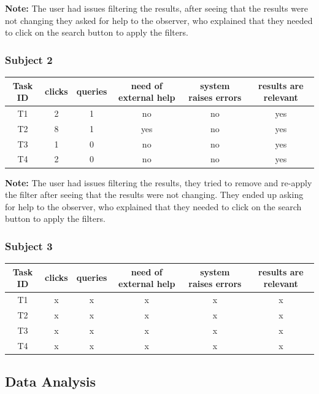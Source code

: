 \documentclass[unicode,9pt,a4paper,oneside,numbers=endperiod,openany]{scrartcl}
\begin{document}
\vspace{0.2cm}

\textbf{Note:} The user had issues filtering the results, after seeing that the results were not changing they asked for help to the observer, 
who explained that they needed to click on the search button to apply the filters.

\subsubsection{Subject 2}

\begin{tabular}{c|c|c|c|c|c}
    Task ID & clicks & queries & need of external help & system raises errors & results are relevant \\ \hline
    T1      & 2      & 1       & no                    & no                   & yes                  \\
    T2      & 8      & 1       & yes                   & no                   & yes                  \\
    T3      & 1      & 0       & no                    & no                   & yes                  \\
    T4      & 2      & 0       & no                    & no                   & yes                  \\
\end{tabular}

\vspace{0.2cm}
\textbf{Note:} The user had issues filtering the results, they tried to remove and re-apply the filter after seeing that the results were not changing.
They ended up asking for help to the observer, who explained that they needed to click on the search button to apply the filters.

\subsubsection{Subject 3}

\begin{tabular}{c|c|c|c|c|c}
    Task ID & clicks & queries & need of external help & system raises errors & results are relevant \\ \hline
    T1      & x      & x       & x                     & x                    & x                    \\
    T2      & x      & x       & x                     & x                    & x                    \\
    T3      & x      & x       & x                     & x                    & x                    \\
    T4      & x      & x       & x                     & x                    & x                    \\
\end{tabular}

\subsection{Data Analysis}
\end{document}

